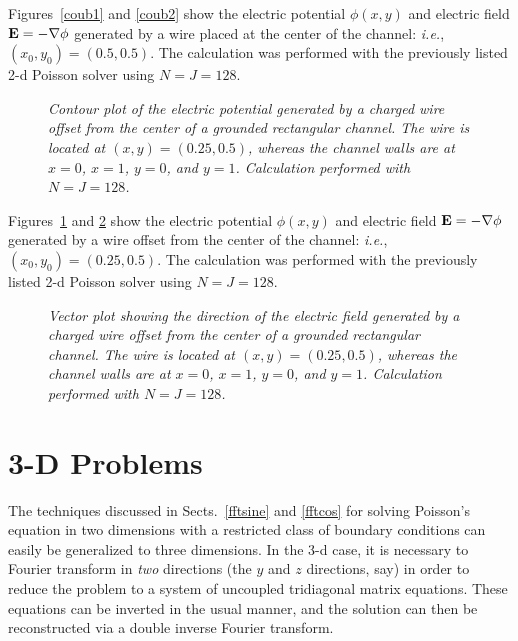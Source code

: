 Figures~\ref{coub1} and \ref{coub2} show the electric potential $\phi(x,y)$ and  electric
field ${\bf E} = -\nabla \phi$ generated by a wire placed at the center of the
channel: {\em i.e.}, $(x_0,y_0) = (0.5,0.5)$. The calculation was performed with the
previously listed 2-d Poisson solver using
$N=J=128$.

\begin{figure}
\epsfysize=3in
\centerline{}
\caption{\em  Contour plot of the electric potential  generated by
 a charged wire offset from the center of a grounded
rectangular channel. The wire is located at $(x,y)=(0.25,0.5)$, whereas the
channel walls are at $x=0$, $x=1$, $y=0$, and $y=1$. Calculation performed with $N=J=128$. }\label{coub3}
\end{figure}

Figures~\ref{coub3} and \ref{coub4} show the electric potential $\phi(x,y)$ and  electric
field ${\bf E} = -\nabla \phi$ generated by a wire offset from the center of the
channel: {\em i.e.}, $(x_0,y_0) = (0.25,0.5)$. The calculation was performed with the
previously listed 2-d Poisson solver using
$N=J=128$.

\begin{figure}
\epsfysize=3in
\centerline{}
\caption{\em  Vector plot showing the direction of the electric field generated by a charged wire 
offset from the center of a grounded
rectangular channel. The wire is located at $(x,y)=(0.25,0.5)$, whereas the
channel walls are at $x=0$, $x=1$, $y=0$, and $y=1$. Calculation performed with $N=J=128$. }\label{coub4}
\end{figure}

\section{3-D Problems}
The techniques discussed in Sects.~\ref{fftsine} and \ref{fftcos} for solving
Poisson's equation in two dimensions with a restricted class of boundary conditions can easily
be generalized to three dimensions. In the 3-d case, it is necessary to Fourier
transform in {\em two} directions (the $y$ and $z$ directions, say) in order to reduce the
problem to a system of uncoupled tridiagonal matrix equations. These equations can be inverted
in the usual manner, and the solution can then be reconstructed via a double inverse Fourier
transform.